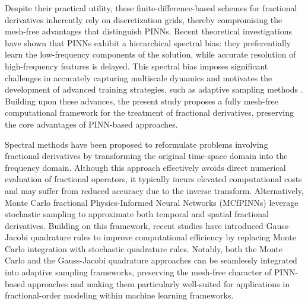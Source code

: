 \documentclass[preprint,3p,times]{elsarticle}
\begin{document}
Despite their practical utility, these finite-difference-based schemes for fractional derivatives inherently rely on discretization grids, thereby compromising the mesh-free advantages that distinguish PINNs. Recent theoretical investigations \cite{Ren2023, WangYuParis:2022:NTK} have shown that PINNs exhibit a hierarchical spectral bias: they preferentially learn the low-frequency components of the solution, while accurate resolution of high-frequency features is delayed. This spectral bias imposes significant challenges in accurately capturing multiscale dynamics and motivates the development of advanced training strategies, such as adaptive sampling methods \cite{LuLu:2023:RAD, Zhang2025}. Building upon these advances, the present study proposes a fully mesh-free computational framework for the treatment of fractional derivatives, preserving the core advantages of PINN-based approaches.

Spectral methods \cite{Zhang2025Spectral, Chen2025} have been proposed to reformulate problems involving fractional derivatives by transforming the original time-space domain into the frequency domain. Although this approach effectively avoids direct numerical evaluation of fractional operators, it typically incurs elevated computational costs and may suffer from reduced accuracy due to the inverse transform. Alternatively, Monte Carlo fractional Physics-Informed Neural Networks (MCfPINNs) \cite{Guo2022:MCfPINN} leverage stochastic sampling to approximate both temporal and spatial fractional derivatives. Building on this framework, recent studies \cite{Hu2024:CMAME, Lin2025} have introduced Gauss-Jacobi quadrature rules to improve computational efficiency by replacing Monte Carlo integration with stochastic quadrature rules. Notably, both the Monte Carlo and the Gauss-Jacobi quadrature approaches can be seamlessly integrated into adaptive sampling frameworks, preserving the mesh-free character of PINN-based approaches and making them particularly well-suited for applications in fractional-order modeling within machine learning frameworks.
\end{document}
